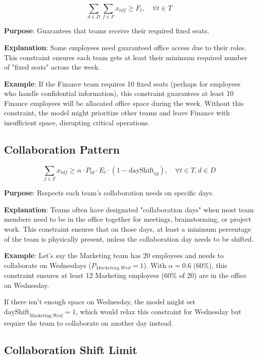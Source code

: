 \documentclass[12pt,a4paper]{article}
\begin{document}
\begin{equation}
\sum_{d\in D} \sum_{f\in F} x_{tdf} \geq F_t, \quad \forall t \in T
\end{equation}

\textbf{Purpose}: Guarantees that teams receive their required fixed seats.

\textbf{Explanation}: Some employees need guaranteed office access due to their roles. This constraint ensures each team gets at least their minimum required number of "fixed seats" across the week.

\textbf{Example}: If the Finance team requires 10 fixed seats (perhaps for employees who handle confidential information), this constraint guarantees at least 10 Finance employees will be allocated office space during the week. Without this constraint, the model might prioritize other teams and leave Finance with insufficient space, disrupting critical operations.

\subsection{Collaboration Pattern}

\begin{equation}
\sum_{f\in F} x_{tdf} \geq \alpha \cdot P_{td} \cdot E_t \cdot (1 - \text{dayShift}_{td}), \quad \forall t \in T, d \in D
\end{equation}

\textbf{Purpose}: Respects each team's collaboration needs on specific days.

\textbf{Explanation}: Teams often have designated "collaboration days" when most team members need to be in the office together for meetings, brainstorming, or project work. This constraint ensures that on those days, at least a minimum percentage of the team is physically present, unless the collaboration day needs to be shifted.

\textbf{Example}: Let's say the Marketing team has 20 employees and needs to collaborate on Wednesdays ($P_{Marketing,Wed} = 1$). With $\alpha = 0.6$ (60\%), this constraint ensures at least 12 Marketing employees (60\% of 20) are in the office on Wednesday. 

If there isn't enough space on Wednesday, the model might set 
\(\text{dayShift}_{\text{Marketing,Wed}} = 1\), which would relax this constraint for Wednesday but require the team to collaborate on another day instead.

\subsection{Collaboration Shift Limit}
\end{document}
